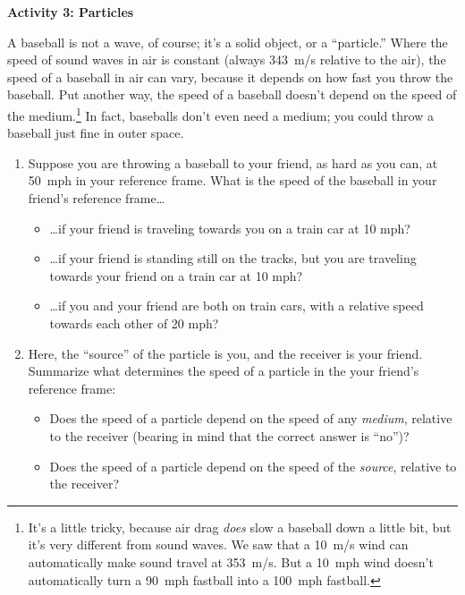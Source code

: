 \pagebreak[3]
\textbf{Activity 3: Particles}

A baseball is not a wave, of course; it's a solid object, or a ``particle.''  
Where the speed of sound waves in air is constant (always 343~m/s relative to the air), the speed of a baseball in air can vary, because it depends on how fast you throw the baseball.  Put another way, the speed of a baseball doesn't depend on the speed of the medium.\footnote{It's a little tricky, because air drag \textit{does} slow a baseball down a little bit, but it's very different from sound waves.  We saw that a 10~m/s wind can automatically make sound travel at 353~m/s.  But a 10~mph wind doesn't automatically turn a 90~mph fastball into a 100~mph fastball.}  
In fact, baseballs don't even need a medium; you could throw a baseball just fine in outer space.

\begin{enumerate}[labparts]
\item Suppose you are throwing a baseball to your friend, as hard as you can, at 50~mph in your reference frame.  What is the speed of the baseball in your friend's reference frame\ldots
\begin{itemize}
\item {\ldots}if your friend is traveling towards you on a train car at 10 mph?
\answerspace{0.2in}

\item {\ldots}if your friend is standing still on the tracks, but you are traveling towards your friend on a train car at 10 mph?
\answerspace{0.2in}

\item {\ldots}if you and your friend are both on train cars, with a relative speed towards each other of 20 mph?
\answerspace{0.2in}
\end{itemize}

\item Here, the ``source'' of the particle is you, and the receiver is your friend.  Summarize what determines the speed of a particle in the your friend's reference frame:
\begin{itemize}
\item Does the speed of a particle depend on the speed of any \textit{medium}, relative to the receiver (bearing in mind that the correct answer is ``no'')?
\answerspace{0.5in}
\item Does the speed of a particle depend on the speed of the \textit{source}, relative to the receiver?
\answerspace{0.5in}
\end{itemize}

\end{enumerate}

